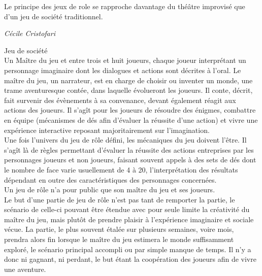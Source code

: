 \begin{shadequote}
Le principe des jeux de role se rapproche davantage du théâtre improvisé que d'un jeu de société traditionnel. \par\emph{C{\'e}cile Cristofari \cite{cristofari2010lecteur}}
\end{shadequote}



Jeu de société\\
Un Maître du jeu et entre trois et huit joueurs, chaque joueur interprétant un personnage imaginaire dont les dialogues et actions sont décrites à l'oral. Le maître du jeu, un narrateur, est en charge de choisir ou inventer un monde, une trame aventuresque contée, dans laquelle évolueront les joueurs. Il conte, décrit, fait survenir des évènements à sa convenance, devant également réagit aux actions des joueurs. Il s'agît pour les joueurs de résoudre des énigmes, combattre en équipe (mécanismes de dés afin d'évaluer la réussite d'une action) et vivre une expérience interactive reposant majoritairement sur l'imagination.\\
Une fois l'univers du jeu de rôle défini, les mécaniques du jeu doivent l'être. Il s'agît là de règles permettant d'évaluer la réussite des actions entreprises par les personnages joueurs et non joueurs, faisant souvent appels à des sets de dés dont le nombre de face varie usuellement de 4 à 20, l'interprétation des résultats dépendant en outre des caractéristiques des personnages concernées.\\
Un jeu de rôle n'a pour public que son maître du jeu et ses joueurs.\\
Le but d'une partie de jeu de rôle n'est pas tant de remporter la partie, le scénario de celle-ci pouvant être étendue avec pour seule limite la créativité du maître du jeu, mais plutôt de prendre plaisir à l'expérience imaginaire et sociale vécue. La partie, le plus souvent étalée sur plusieurs semaines, voire mois, prendra alors fin lorsque le maître du jeu estimera le monde suffisamment exploré, le scénario principal accompli ou par simple manque de temps. Il n'y a donc ni gagnant, ni perdant, le but étant la coopération des joueurs afin de vivre une aventure.\\


